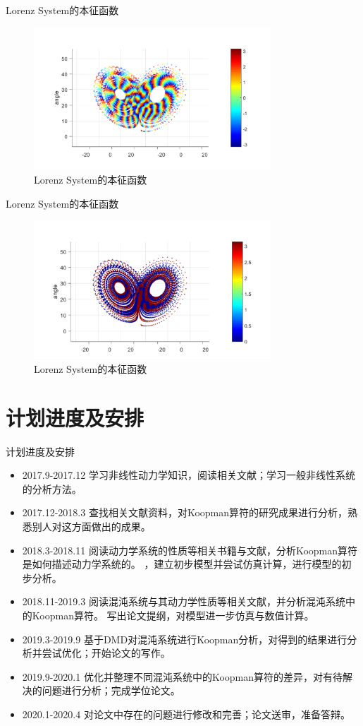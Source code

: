 \documentclass{beamer}
\begin{document}
\begin{frame}{Lorenz System的本征函数}
\begin{figure}
	\centering
	\includegraphics[width=3.5in]{figure/lorenz_eigen}
	\caption{Lorenz System的本征函数}
\end{figure}
\end{frame}

\begin{frame}{Lorenz System的本征函数}
\begin{figure}
	\centering
	\includegraphics[width=3.5in]{figure/lorenz_eigen_bin}
	\caption{Lorenz System的本征函数}
\end{figure}
\end{frame}

\section{计划进度及安排}
\begin{frame}{计划进度及安排}
\begin{itemize}
	\item 2017.9-2017.12
	学习非线性动力学知识，阅读相关文献；学习一般非线性系统的分析方法。
	\item 2017.12-2018.3
	查找相关文献资料，对Koopman算符的研究成果进行分析，熟悉别人对这方面做出的成果。
	\item 2018.3-2018.11
	阅读动力学系统的性质等相关书籍与文献，分析Koopman算符是如何描述动力学系统的。
	，建立初步模型并尝试仿真计算，进行模型的初步分析。
	\item 2018.11-2019.3
	阅读混沌系统与其动力学性质等相关文献，并分析混沌系统中的Koopman算符。
	写出论文提纲，对模型进一步仿真与数值计算。
	\item 2019.3-2019.9
	基于DMD对混沌系统进行Koopman分析，对得到的结果进行分析并尝试优化；开始论文的写作。
	\item 2019.9-2020.1
	优化并整理不同混沌系统中的Koopman算符的差异，对有待解决的问题进行分析；完成学位论文。
	\item 2020.1-2020.4
	对论文中存在的问题进行修改和完善；论文送审，准备答辩。
\end{itemize}
\end{frame}
\end{document}
